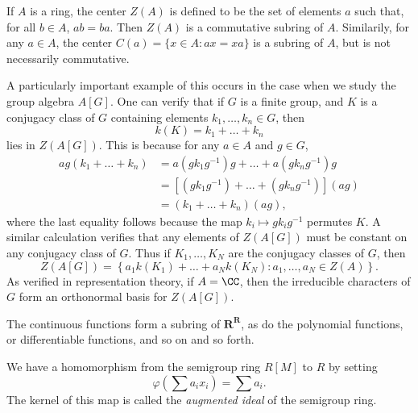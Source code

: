 \begin{example}
    If $A$ is a ring, the center $Z(A)$ is defined to be the set of elements $a$ such that, for all $b \in A$, $ab = ba$. Then $Z(A)$ is a commutative subring of $A$. Similarily, for any $a \in A$, the center $C(a) = \{ x \in A: ax = xa \}$ is a subring of $A$, but is not necessarily commutative.

    A particularly important example of this occurs in the case when we study the group algebra $A[G]$. One can verify that if $G$ is a finite group, and $K$ is a conjugacy class of $G$ containing elements $k_1, \dots, k_n \in G$, then
    \[ k(K) = k_1 + \dots + k_n \]
    lies in $Z(A[G])$. This is because for any $a \in A$ and $g \in G$,
    \begin{align*}
        ag(k_1 + \dots + k_n) &= a(gk_1g^{-1}) g + \dots + a(gk_ng^{-1}) g\\
        &= [(gk_1g^{-1}) + \dots + (gk_ng^{-1})] (ag)\\
        &= (k_1 + \dots + k_n) (ag),
    \end{align*}
    where the last equality follows because the map $k_i \mapsto gk_ig^{-1}$ permutes $K$. A similar calculation verifies that any elements of $Z(A[G])$ must be constant on any conjugacy class of $G$. Thus if $K_1, \dots, K_N$ are the conjugacy classes of $G$, then
    \[ Z(A[G]) = \left\{ a_1 k(K_1) + \dots + a_N k(K_N) : a_1, \dots, a_N \in Z(A) \right\}. \]
    As verified in representation theory, if $A = \CC$, then the irreducible characters of $G$ form an orthonormal basis for $Z(A[G])$. 
\end{example}

\begin{example}
    The continuous functions form a subring of $\mathbf{R}^\mathbf{R}$, as do the polynomial functions, or differentiable functions, and so on and so forth.
\end{example}

\begin{example}
    We have a homomorphism from the semigroup ring $R[M]$ to $R$ by setting
    \[ \varphi \left(\sum a_i x_i \right) = \sum a_i. \]
    The kernel of this map is called the \emph{augmented ideal} of the semigroup ring.
\end{example}

